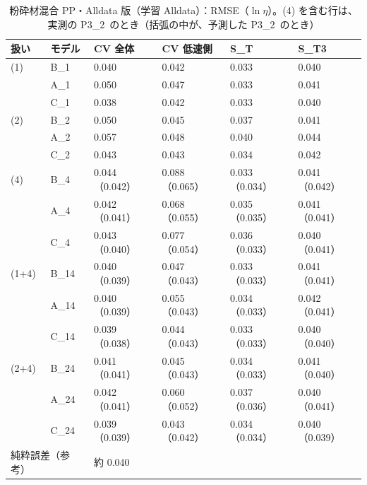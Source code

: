 \documentclass[paper=a4paper,fontsize=10.5pt,line_length=44zw,number_of_lines=38]{jlreq}
\newcommand{\PII}{P3\_2}
\begin{document}
\begin{table}[H]
\caption{粉砕材混合 PP・Alldata 版（学習 Alldata）：RMSE（$\ln\eta$）。(4) を含む行は、実測の \PII\ のとき（括弧の中が、予測した \PII\ のとき）}\label{tab:met_Alldata_MIX}
\footnotesize
\begin{tabularx}{\linewidth}{@{}llXXXX@{}}
\toprule
扱い & モデル & CV 全体 & CV 低速側 & S\_T & S\_T3 \\
\midrule
(1) & B\_1 & 0.040 & 0.042 & 0.033 & 0.040 \\
 & A\_1 & 0.050 & 0.047 & 0.033 & 0.041 \\
 & C\_1 & 0.038 & 0.042 & 0.033 & 0.040 \\
\midrule
(2) & B\_2 & 0.050 & 0.045 & 0.037 & 0.041 \\
 & A\_2 & 0.057 & 0.048 & 0.040 & 0.044 \\
 & C\_2 & 0.043 & 0.043 & 0.034 & 0.042 \\
\midrule
(4) & B\_4 & 0.044（0.042） & 0.088（0.065） & 0.033（0.034） & 0.041（0.042） \\
 & A\_4 & 0.042（0.041） & 0.068（0.055） & 0.035（0.035） & 0.041（0.041） \\
 & C\_4 & 0.043（0.040） & 0.077（0.054） & 0.036（0.033） & 0.040（0.041） \\
\midrule
(1+4) & B\_14 & 0.040（0.039） & 0.047（0.043） & 0.033（0.033） & 0.041（0.041） \\
 & A\_14 & 0.040（0.039） & 0.055（0.043） & 0.034（0.033） & 0.042（0.041） \\
 & C\_14 & 0.039（0.038） & 0.044（0.043） & 0.033（0.033） & 0.040（0.040） \\
\midrule
(2+4) & B\_24 & 0.041（0.041） & 0.045（0.043） & 0.034（0.033） & 0.041（0.040） \\
 & A\_24 & 0.042（0.041） & 0.060（0.052） & 0.037（0.036） & 0.040（0.041） \\
 & C\_24 & 0.039（0.039） & 0.043（0.042） & 0.034（0.034） & 0.040（0.039） \\
\multicolumn{2}{l}{純粋誤差（参考）} & \multicolumn{4}{l}{約 0.040} \\
\bottomrule
\end{tabularx}
\end{table}
\end{document}
